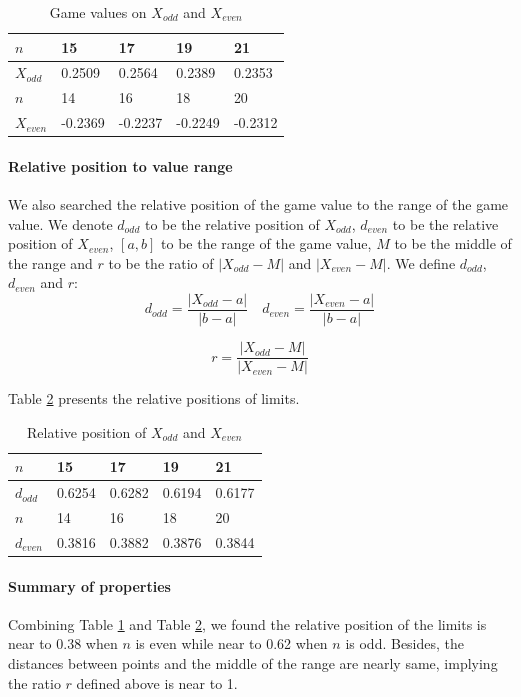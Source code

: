 \documentclass[a4paper,english]{article}
\begin{document}
\begin{spacing}{1.4}
\begin{table}
\centering
\begin{tabular}{lllll}
\hline
 $n$ & 15 & 17 & 19 & 21 \\
 \hline
 $X_{odd}$ & 0.2509 & 0.2564 & 0.2389 & 0.2353 \\
 \hline
 $n$ & 14 & 16 & 18 & 20 \\
 \hline
 $X_{even}$ & -0.2369 &  -0.2237 & -0.2249 & -0.2312 \\
 \hline
\end{tabular}
\caption{Game values on $X_{odd}$ and $X_{even}$}
\label{Game-value-table}
\end{table}

\paragraph{Relative position to value range}
We also searched the relative position of the game value to the range of the game value. We denote $d_{odd}$ to be the relative position of $X_{odd}$, $d_{even}$ to be the relative position of $X_{even}$, $[a,b]$ to be the range of the game value, $M$ to be the middle of the range and $r$ to be the ratio of $|X_{odd}-M|$ and $|X_{even}-M|$. We define $d_{odd}$, $d_{even}$ and $r$:
\begin{equation*}
    d_{odd}=\frac{|X_{odd}-a|}{|b-a|} \quad d_{even}=\frac{|X_{even}-a|}{|b-a|}
\end{equation*}

\begin{equation*}
    r = \frac{|X_{odd}-M|}{|X_{even}-M|}
\end{equation*}

Table \ref{relative-position} presents the relative positions of limits.
\begin{table}
\centering
\begin{tabular}{lllll}
\hline
 $n$ & 15 & 17 & 19 & 21 \\
 \hline
 $d_{odd}$ & 0.6254 & 0.6282 & 0.6194 & 0.6177 \\
 \hline
 $n$ & 14 & 16 & 18 & 20 \\
 \hline
 $d_{even}$ & 0.3816 &  0.3882 & 0.3876 & 0.3844 \\
 \hline
\end{tabular}
\caption{Relative position of $X_{odd}$ and $X_{even}$}
\label{relative-position}
\end{table}

\paragraph{Summary of properties}
Combining Table \ref{Game-value-table} and Table \ref{relative-position}, we found the relative position of the limits is near to 0.38 when $n$ is even while near to 0.62 when $n$ is odd. Besides, the distances between points and the middle of the range are nearly same, implying the ratio $r$ defined above is near to 1.


\end{spacing}
\end{document}
